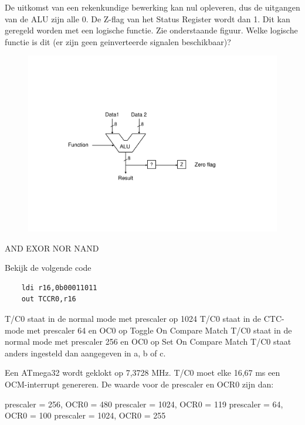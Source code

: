 \documentclass[a4paper,12pt,fleqn,dutch]{tisdexam}
\begin{document}
\begin{questions}
\question
\label{opg:opg13}
De uitkomst van een rekenkundige bewerking kan nul opleveren, dus de uitgangen van de
ALU zijn alle 0. De Z-flag van het Status Register wordt dan 1. Dit kan geregeld worden met een
logische functie. Zie onderstaande figuur. Welke logische functie is dit (er zijn geen
geinverteerde signalen beschikbaar)?
\begin{figure}[H]
  \centering
    \includegraphics*[viewport=130 170 540 410,scale=0.55]{pINLMIC_zero_flag.pdf}
\end{figure}
\begin{choices}
	\choice AND
	\choice EXOR
	\CorrectChoice \label{ans:opg13} NOR
	\choice NAND
\end{choices}


\newpage
\question
\label{opg:opg14}
Bekijk de volgende code
\begin{verbatim}
    ldi r16,0b00011011
    out TCCR0,r16
\end{verbatim}
\begin{choices}
	\choice T/C0 staat in de normal mode met prescaler op 1024
	\CorrectChoice \label{ans:opg14} T/C0 staat in de CTC-mode met prescaler 64 en OC0 op Toggle On Compare Match
	\choice T/C0 staat in de normal mode met prescaler 256 en OC0 op Set On Compare Match
	\choice T/C0 staat anders ingesteld dan aangegeven in a, b of c.
\end{choices}


\question
\label{opg:opg15}
Een ATmega32 wordt geklokt op 7,3728 MHz. T/C0 moet elke 16,67 ms een OCM-interrupt
genereren. De waarde voor de prescaler en OCR0 zijn dan:
\begin{choices}
	\choice prescaler = 256, OCR0 = 480
	\CorrectChoice \label{ans:opg15} prescaler = 1024, OCR0 = 119
	\choice prescaler = 64, OCR0 = 100
	\choice prescaler = 1024, OCR0 = 255
\end{choices}



\end{questions}
\end{document}
